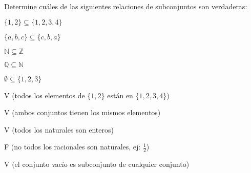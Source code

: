 \begin{exercise}
\problem Determine cuáles de las siguientes relaciones de subconjuntos son verdaderas:

\begin{exerciselist}
    \item $\{1, 2\} \subseteq \{1, 2, 3, 4\}$ \hspace{2cm} \underline{\hspace{2cm}}
    \item $\{a, b, c\} \subseteq \{c, b, a\}$ \hspace{2cm} \underline{\hspace{2cm}}
    \item $\mathbb{N} \subseteq \mathbb{Z}$ \hspace{2cm} \underline{\hspace{2cm}}
    \item $\mathbb{Q} \subseteq \mathbb{N}$ \hspace{2cm} \underline{\hspace{2cm}}
    \item $\emptyset \subseteq \{1, 2, 3\}$ \hspace{2cm} \underline{\hspace{2cm}}
\end{exerciselist}

\begin{solucion}
\begin{exerciselist}
    \item V (todos los elementos de $\{1, 2\}$ están en $\{1, 2, 3, 4\}$)
    \item V (ambos conjuntos tienen los mismos elementos)
    \item V (todos los naturales son enteros)
    \item F (no todos los racionales son naturales, ej: $\frac{1}{2}$)
    \item V (el conjunto vacío es subconjunto de cualquier conjunto)
\end{exerciselist}
\end{solucion}
\end{exercise}

